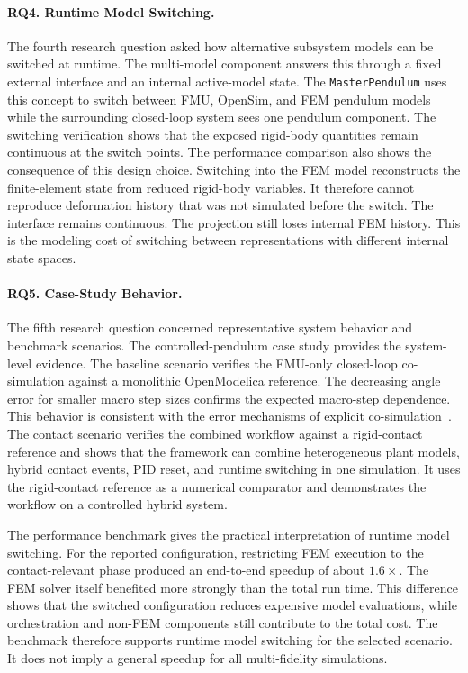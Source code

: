 \paragraph{RQ4. Runtime Model Switching.}
The fourth research question asked how alternative subsystem models can be switched at runtime.
The multi-model component answers this through a fixed external interface and an internal active-model state.
The \texttt{MasterPendulum} uses this concept to switch between FMU, OpenSim, and FEM pendulum models while the surrounding closed-loop system sees one pendulum component.
The switching verification shows that the exposed rigid-body quantities remain continuous at the switch points.
The performance comparison also shows the consequence of this design choice.
Switching into the FEM model reconstructs the finite-element state from reduced rigid-body variables.
It therefore cannot reproduce deformation history that was not simulated before the switch.
The interface remains continuous.
The projection still loses internal FEM history.
This is the modeling cost of switching between representations with different internal state spaces.

\paragraph{RQ5. Case-Study Behavior.}
The fifth research question concerned representative system behavior and benchmark scenarios.
The controlled-pendulum case study provides the system-level evidence.
The baseline scenario verifies the FMU-only closed-loop co-simulation against a monolithic OpenModelica reference.
The decreasing angle error for smaller macro step sizes confirms the expected macro-step dependence.
This behavior is consistent with the error mechanisms of explicit co-simulation~\cite{gomes_co-simulation_2019,arnold_error_2013}.
The contact scenario verifies the combined workflow against a rigid-contact reference and shows that the framework can combine heterogeneous plant models, hybrid contact events, PID reset, and runtime switching in one simulation.
It uses the rigid-contact reference as a numerical comparator and demonstrates the workflow on a controlled hybrid system.

The performance benchmark gives the practical interpretation of runtime model switching.
For the reported configuration, restricting \ac{FEM} execution to the contact-relevant phase produced an end-to-end speedup of about \(1.6\times\).
The \ac{FEM} solver itself benefited more strongly than the total run time.
This difference shows that the switched configuration reduces expensive model evaluations, while orchestration and non-\ac{FEM} components still contribute to the total cost.
The benchmark therefore supports runtime model switching for the selected scenario.
It does not imply a general speedup for all multi-fidelity simulations.

